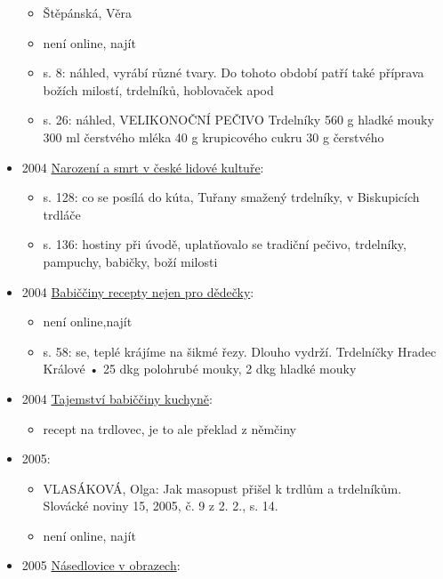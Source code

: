 \begin{itemize}
  \begin{itemize}
  \tightlist
  \item
    Štěpánská, Věra
  \item
    není online, najít
  \item
    s. 8: náhled, vyrábí různé tvary. Do tohoto období patří také
    příprava božích milostí, trdelníků, hoblovaček apod
  \item
    s. 26: náhled, VELIKONOČNÍ PEČIVO Trdelníky 560 g hladké mouky 300
    ml čerstvého mléka 40 g krupicového cukru 30 g čerstvého
  \end{itemize}
\item
  2004
  \href{https://ceskadigitalniknihovna.cz/uuid/uuid:6544a590-d474-11e4-8565-005056827e52}{Narození
  a smrt v české lidové kultuře}:

  \begin{itemize}
  \tightlist
  \item
    s. 128: co se posílá do kúta, Tuřany smažený trdelníky, v
    Biskupicích trdláče
  \item
    s. 136: hostiny při úvodě, uplatňovalo se tradiční pečivo,
    trdelníky, pampuchy, babičky, boží milosti
  \end{itemize}
\item
  2004
  \href{https://ceskadigitalniknihovna.cz/uuid/uuid:5823cdf0-1024-11ea-af21-005056827e52}{Babiččiny
  recepty nejen pro dědečky}:

  \begin{itemize}
  \tightlist
  \item
    není online,najít
  \item
    s. 58: se, teplé krájíme na šikmé řezy. Dlouho vydrží. Trdelníčky
    Hradec Králové • 25 dkg polohrubé mouky, 2 dkg hladké mouky
  \end{itemize}
\item
  2004
  \href{https://ceskadigitalniknihovna.cz/uuid/uuid:b5a5b2c0-dc5e-11e5-984e-005056827e52}{Tajemství
  babiččiny kuchyně}:

  \begin{itemize}
  \tightlist
  \item
    recept na trdlovec, je to ale překlad z němčiny
  \end{itemize}
\item
  2005:

  \begin{itemize}
  \tightlist
  \item
    VLASÁKOVÁ, Olga: Jak masopust přišel k trdlům a trdelníkům. Slovácké
    noviny 15, 2005, č. 9 z 2. 2., s. 14.
  \item
    není online, najít
  \end{itemize}
\item
  2005
  \href{https://ceskadigitalniknihovna.cz/uuid/uuid:024b8100-ced7-11e3-b110-005056827e51}{Násedlovice
  v obrazech}:


\end{itemize}
